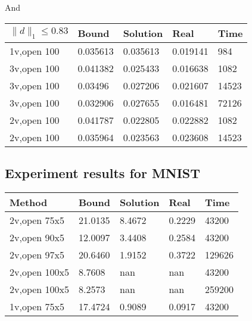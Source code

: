 \documentclass[letterpaper]{article} %
\begin{document}
		\vspace*{1ex}
	
	And 
	
		\vspace*{1ex}
	
	\begin{tabular}{|l|l|l|l|l|}\hline
		$\|d\|_1\leq 0.83$ &        Bound &  Solution &                          Real &  Time \\\hline
		1v,open 100 &     0.035613 &  0.035613 &                      0.019141 &   984 \\\hline
		3v,open 100 &     0.041382 &  0.025433 &                      0.016638 &  1082 \\\hline
		3v,open 100 &      0.03496 &  0.027206 &                      0.021607 & 14523 \\\hline
		3v,open 100 &     0.032906 &  0.027655 &                      0.016481 & 72126 \\\hline
		2v,open 100 &     0.041787 &  0.022805 &                      0.022882 &  1082 \\\hline
		2v,open 100 &     0.035964 &  0.023563 &                      0.023608 & 14523 \\\hline
	\end{tabular}
	
	
	\subsection{Experiment results for MNIST}
	
	
	\begin{tabular}{|l|l|l|l|l|}\hline
		 Method & Bound & Solution & Real & Time \\\hline
		 2v,open 75x5 & 21.0135 & 8.4672& 0.2229 & 43200 \\\hline
		2v,open 90x5 & 12.0097 & 3.4408 & 0.2584 & 43200 \\\hline
	 2v,open 97x5 & 20.6460 & 1.9152 & 0.3722 & 129626 \\\hline
	 2v,open 100x5 & 8.7608 & nan & nan & 43200 \\\hline
		 2v,open 100x5 & 8.2573 & nan & nan & 259200 \\\hline
		 1v,open 75x5 & 17.4724 & 0.9089 & 0.0917 & 43200 \\\hline
	\end{tabular}
	
	
	
	
	
	
	 
	
	
	\bigskip
	
	
	
	
	
\end{document}
